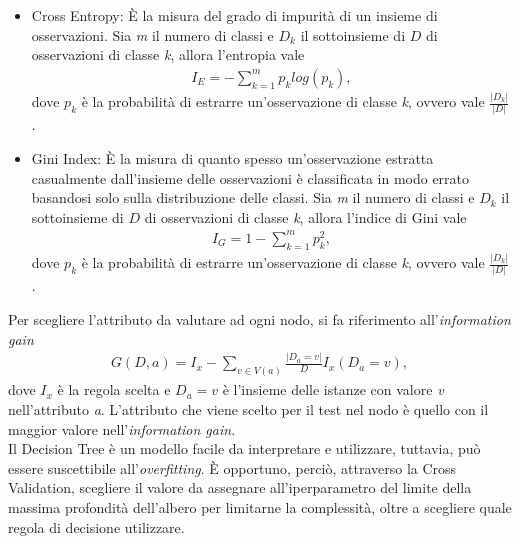 \begin{itemize}
	\item Cross Entropy: È la misura del grado di impurità di un insieme di osservazioni. Sia \emph{m} il numero di classi e $D_k$ il sottoinsieme di $D$ di osservazioni di classe \emph{k}, allora l'entropia vale
	\begin{align*}
		I_E =	- \sum_{k=1}^{m} p_k log(p_k),
	\end{align*} 
	dove $p_k$ è la probabilità di estrarre un'osservazione di classe \emph{k}, ovvero vale $\frac{|D_k|}{|D|}$.
	\item Gini Index: È la misura di quanto spesso un'osservazione estratta casualmente dall'insieme delle osservazioni è classificata in modo errato basandosi solo sulla distribuzione delle classi. Sia \emph{m} il numero di classi e $D_k$ il sottoinsieme di $D$ di osservazioni di classe \emph{k}, allora l'indice di Gini vale
	\begin{align*}
		I_G = 1 - \sum_{k=1}^{m} p_{k}^2,
	\end{align*} 
	dove $p_k$ è la probabilità di estrarre un'osservazione di classe \emph{k}, ovvero vale $\frac{|D_k|}{|D|}$.
\end{itemize}
Per scegliere l'attributo da valutare ad ogni nodo, si fa riferimento all'\emph{information gain}
\begin{align*}
	G(D,a) = I_x - \sum_{v\in V(a)} \frac{|D_a = v|}{D}I_x(D_a=v),
\end{align*} 
dove $I_x$ è la regola scelta e $D_a=v$ è l'insieme delle istanze con valore \emph{v} nell'attributo \emph{a}.
L'attributo che viene scelto per il test nel nodo è quello con il maggior valore nell'\emph{information gain}.\\
Il Decision Tree è un modello facile da interpretare e utilizzare, tuttavia, può essere suscettibile all'\emph{overfitting}. È opportuno, perciò, attraverso la Cross Validation, scegliere il valore da assegnare all'iperparametro del limite della massima profondità dell'albero per limitarne la complessità, oltre a scegliere quale regola di decisione utilizzare.

